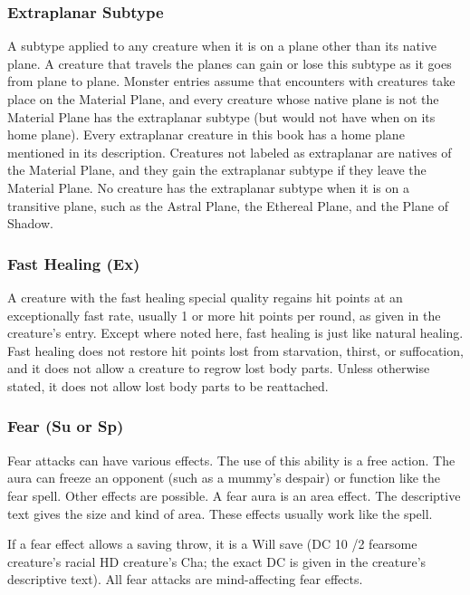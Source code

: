 \subsubsection{Extraplanar Subtype} A subtype applied to any creature when it is on a plane other than its native plane. A creature that travels the planes can gain or lose this subtype as it goes from plane to plane. Monster entries assume that encounters with creatures take place on the Material Plane, and every creature whose native plane is not the Material Plane has the extraplanar subtype (but would not have when on its home plane). Every extraplanar creature in this book has a home plane mentioned in its description. Creatures not labeled as extraplanar are natives of the Material Plane, and they gain the extraplanar subtype if they leave the Material Plane. No creature has the extraplanar subtype when it is on a transitive plane, such as the Astral Plane, the Ethereal Plane, and the Plane of Shadow.

\subsubsection{Fast Healing (Ex)} A creature with the fast healing special quality regains hit points at an exceptionally fast rate, usually 1 or more hit points per round, as given in the creature's entry. Except where noted here, fast healing is just like natural healing. Fast healing does not restore hit points lost from starvation, thirst, or suffocation, and it does not allow a creature to regrow lost body parts. Unless otherwise stated, it does not allow lost body parts to be reattached.

\subsubsection{Fear (Su or Sp)} Fear attacks can have various effects.
 The use of this ability is a free action. The aura can freeze an opponent (such as a mummy's despair) or function like the fear spell. Other effects are possible. A fear aura is an area effect. The descriptive text gives the size and kind of area.
 These effects usually work like the  spell. 
\par If a fear effect allows a saving throw, it is a Will save (DC 10 /2 fearsome creature's racial HD \add creature's Cha; the exact DC is given in the creature's descriptive text). All fear attacks are mind-affecting fear effects.

